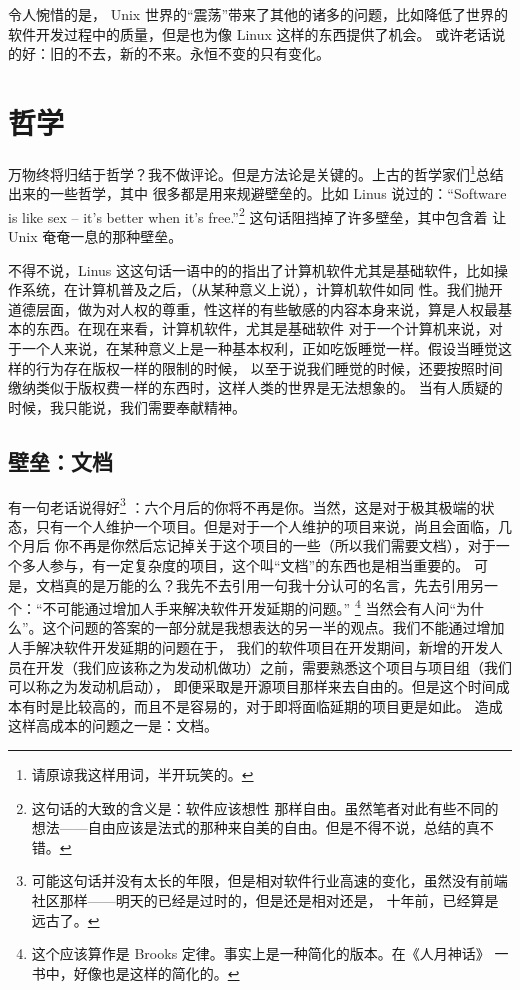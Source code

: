     令人惋惜的是， Unix 世界的“震荡”带来了其他的诸多的问题，比如降低了世界的软件开发过程中的质量，但是也为像 Linux 这样的东西提供了机会。
    或许老话说的好：旧的不去，新的不来。永恒不变的只有变化。

    \section{哲学}
    万物终将归结于哲学？我不做评论。但是方法论是关键的。上古的哲学家们\footnote{请原谅我这样用词，半开玩笑的。}总结出来的一些哲学，其中
    很多都是用来规避壁垒的。比如 Linus 说过的：“Software is like sex -- it's better when it's free.”\footnote{这句话的大致的含义是：软件应该想性
    那样自由。虽然笔者对此有些不同的想法——自由应该是法式的那种来自美的自由。但是不得不说，总结的真不错。} 这句话阻挡掉了许多壁垒，其中包含着 让
    Unix 奄奄一息的那种壁垒。

    不得不说，Linus 这这句话一语中的的指出了计算机软件尤其是基础软件，比如操作系统，在计算机普及之后，（从某种意义上说），计算机软件如同
    性。我们抛开道德层面，做为对人权的尊重，性这样的有些敏感的内容本身来说，算是人权最基本的东西。在现在来看，计算机软件，尤其是基础软件
    对于一个计算机来说，对于一个人来说，在某种意义上是一种基本权利，正如吃饭睡觉一样。假设当睡觉这样的行为存在版权一样的限制的时候，
    以至于说我们睡觉的时候，还要按照时间缴纳类似于版权费一样的东西时，这样人类的世界是无法想象的。
    当有人质疑的时候，我只能说，我们需要奉献精神。
    
    \subsection{壁垒：文档}
    有一句老话说得好\footnote{可能这句话并没有太长的年限，但是相对软件行业高速的变化，虽然没有前端社区那样——明天的已经是过时的，但是还是相对还是，
        十年前，已经算是远古了。}
    ：六个月后的你将不再是你。当然，这是对于极其极端的状态，只有一个人维护一个项目。但是对于一个人维护的项目来说，尚且会面临，几个月后
    你不再是你然后忘记掉关于这个项目的一些（所以我们需要文档），对于一个多人参与，有一定复杂度的项目，这个叫“文档”的东西也是相当重要的。
    可是，文档真的是万能的么？我先不去引用一句我十分认可的名言，先去引用另一个：“不可能通过增加人手来解决软件开发延期的问题。”
    \footnote{这个应该算作是 Brooks 定律。事实上是一种简化的版本。在《人月神话》 一书中，好像也是这样的简化的。}
    当然会有人问“为什么”。这个问题的答案的一部分就是我想表达的另一半的观点。我们不能通过增加人手解决软件开发延期的问题在于，
    我们的软件项目在开发期间，新增的开发人员在开发（我们应该称之为发动机做功）之前，需要熟悉这个项目与项目组（我们可以称之为发动机启动），
    即便采取是开源项目那样来去自由的。但是这个时间成本有时是比较高的，而且不是容易的，对于即将面临延期的项目更是如此。
    造成这样高成本的问题之一是：文档。

